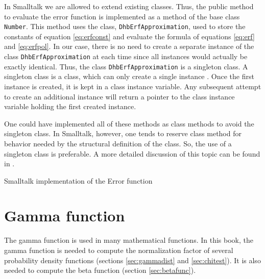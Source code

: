 \documentclass[twoside]{book}
\begin{document}
In Smalltalk we are allowed to extend existing classes. Thus, the
public method to evaluate the error function is implemented as a
method of the base class {\tt Number}. This method uses the class,
{\tt DhbErfApproximation}, used to store the constants of equation
\ref{eq:erfconst} and evaluate the formula of equations
\ref{eq:erf} and \ref{eq:erfpol}. In our case, there is no need to
create a separate instance of the class {\tt DhbErfApproximation}
at each time since all instances would actually be exactly
identical. Thus, the class {\tt DhbErfApproximation} is a
singleton class. A singleton class is a class, which can only
create a single instance \cite{GoF}. Once the first instance is
created, it is kept in a class instance variable. Any subsequent
attempt to create an additional instance will return a pointer to
the class instance variable holding the first created instance.

One could have implemented all of these methods as class methods
to avoid the singleton class. In Smalltalk, however, one tends to
reserve class method for behavior needed by the structural
definition of the class. So, the use of a singleton class is
preferable. A more detailed discussion of this topic can be found
in \cite{StDesPat}.

\begin{listing}
Smalltalk implementation of the Error function
\label{ls:errorFunction}


\end{listing}


\section{Gamma function}
The gamma function is used in many mathematical functions. In this
book, the gamma function is needed to compute the normalization
factor of several probability density functions (\cf sections
\ref{sec:gammadist} and \ref{sec:chitest}). It is also needed to
compute the beta function (\cf section \ref{sec:betafunc}).
\end{document}
